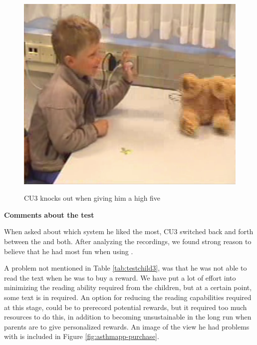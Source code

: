 \begin{figure}
\begin{minipage}[t]{0.3\linewidth}
		\label{fig:child-knockout2}
	\end{minipage}
	\hspace{0.5cm}
	\begin{minipage}[t]{0.3\linewidth}
		\centering
			\includegraphics[width=0.20\paperwidth]{Pictures/usability-pictures/knockout3.png}
		\label{fig:child-knockout3}
	\end{minipage}
	\label{fig:child-knockout}
	\caption{CU3 knocks out \ab{} when giving him a high five}
\end{figure}

\textbf{Comments about the test}

When asked about which system he liked the most, CU3 switched back and forth between the \app{} and both. After analyzing the recordings, we found strong reason to believe that he had most fun when using \app{}. 


A problem not mentioned in Table \ref{tab:testchild3}, was that he was not able to read the text when he was to buy a reward. We have put a lot of effort into minimizing the reading ability required from the children, but at a certain point, some text is in required. An option for reducing the reading capabilities required at this stage, could be to prerecord potential rewards, but it required too much resources to do this, in addition to becoming unsustainable in the long run when parents are to give personalized rewards. An image of the view he had problems with is included in Figure \ref{fig:asthmapp-purchase}.   
 
